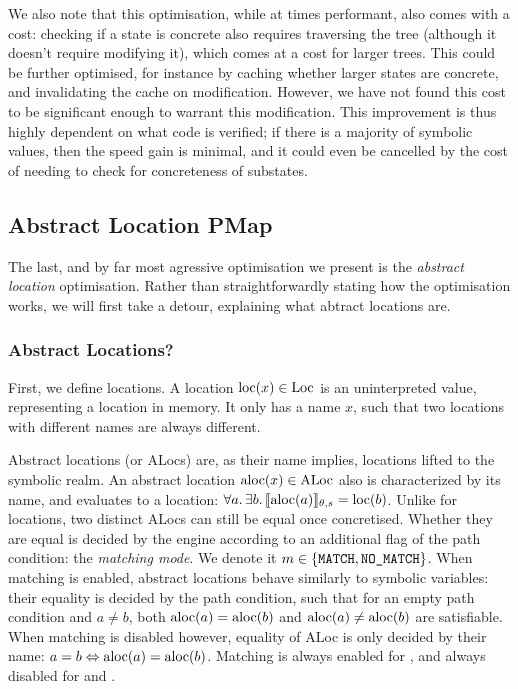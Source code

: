 We also note that this optimisation, while at times performant, also comes with a cost: checking if a state is concrete also requires traversing the tree (although it doesn't require modifying it), which comes at a cost for larger trees. This could be further optimised, for instance by caching whether larger states are concrete, and invalidating the cache on modification. However, we have not found this cost to be significant enough to warrant this modification. This improvement is thus highly dependent on what code is verified; if there is a majority of symbolic values, then the speed gain is minimal, and it could even be cancelled by the cost of needing to check for concreteness of substates.

\subsection{Abstract Location PMap}

The last, and by far most agressive optimisation we present is the \emph{abstract location} optimisation. Rather than straightforwardly stating how the optimisation works, we will first take a detour, explaining what abtract locations are.

\subsubsection{Abstract Locations?}

First, we define locations. A location $\text{loc}(x)\in\text{Loc}$ is an uninterpreted value, representing a location in memory. It only has a name $x$, such that two locations with different names are always different.

Abstract locations (or ALocs) are, as their name implies, locations lifted to the symbolic realm. An abstract location $\text{aloc}(x)\in\text{ALoc}$ also is characterized by its name, and evaluates to a location: $\forall a\ldotp \exists b\ldotp \llbracket\text{aloc}(a)\rrbracket_{\theta,s}=\text{loc}(b)$. Unlike for locations, two distinct ALocs can still be equal once concretised. Whether they are equal is decided by the engine according to an additional flag of the path condition: the \emph{matching mode}. We denote it $m\in\{\texttt{MATCH},\texttt{NO\_MATCH}\}$. When matching is enabled, abstract locations behave similarly to symbolic variables: their equality is decided by the path condition, such that for an empty path condition and $a\neq b$, both $\text{aloc}(a)=\text{aloc}(b)$ and $\text{aloc}(a)\neq\text{aloc}(b)$ are satisfiable. When matching is disabled however, equality of ALoc is only decided by their name: $a=b\Leftrightarrow \text{aloc}(a)=\text{aloc}(b)$. Matching is always enabled for \consume, and always disabled for \produce{} and \execac.


